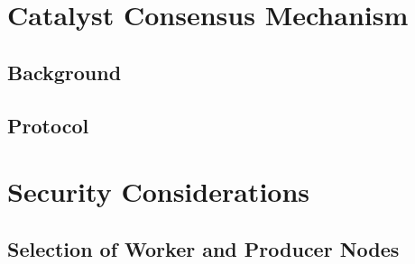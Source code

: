 \documentclass[a4paper, 12pt]{article}
\begin{document}
 \newpage

\section{Catalyst Consensus Mechanism} \label{Cha:CM}





\subsection{Background}\label{Sec:Cbg}



\subsection{Protocol}\label{Sec:Dem}





%



%

 \newpage
 
\section{Security Considerations} \label{Cha:Sec}




\subsection{Selection of Worker and Producer Nodes}\label{Sec:ConSec}
\end{document}

